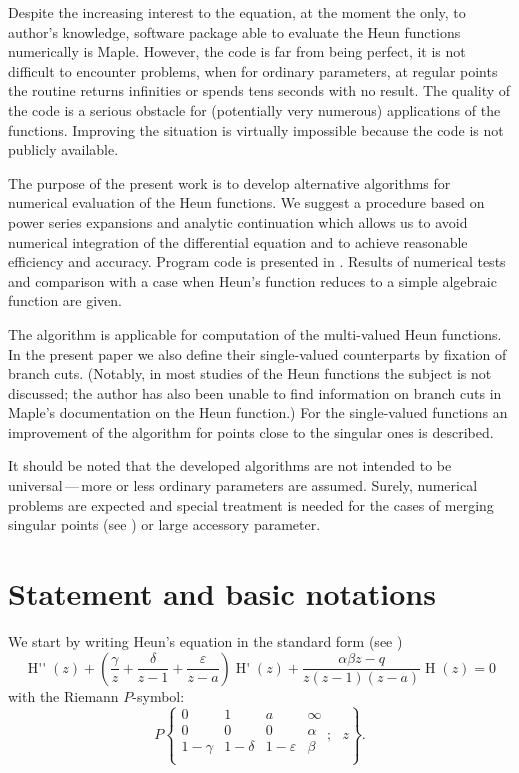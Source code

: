 \documentclass[11pt]{article}
\newcommand{\MF}[1]{\mathop{#1}\nolimits}
\def\Heun{H}%
\begin{document}
Despite the increasing interest to the equation, at the moment the only, to
author's knowledge, software package able to evaluate the Heun functions
numerically is Maple. However, the code is far from being perfect, it is not
difficult to encounter problems, when for ordinary parameters, at regular points
the routine returns infinities or spends tens seconds with no result. The quality
of the code is a serious obstacle for (potentially very numerous) applications
of the functions. Improving the situation is virtually impossible because the
code is not publicly available. 

The purpose of the present work is to develop alternative algorithms for
numerical evaluation of the Heun functions. We suggest a procedure based on
power series expansions and analytic continuation which allows us to avoid
numerical integration of the differential equation and to achieve reasonable
efficiency and accuracy. Program code is presented in \cite{mycode}. Results of
numerical tests and comparison with a case when Heun's function reduces to a
simple algebraic function are given.

The algorithm is applicable for computation of the multi-valued Heun functions.
In the present paper we also define their single-valued counterparts by fixation
of branch cuts. (Notably, in most studies of the Heun functions the subject is
not discussed; the author has also been unable to find information on branch
cuts in Maple's documentation on the Heun function.) For the single-valued
functions an improvement of the algorithm for points close to the singular ones
is described.

It should be noted that the developed algorithms are not intended to be
universal\,---\,more or less ordinary parameters are assumed. Surely, numerical
problems are expected and special treatment is needed for the cases of merging
singular points (see \cite{LaySlavyanov1999}) or large accessory parameter.

\section{Statement and basic notations} 
\label{sect:statement}

We start by writing Heun's equation in the standard form (see \cite{Erdelyi1955})
\begin{equation}
  \MF{\Heun''}(z)+\left(\frac{\gamma}{z}+\frac{\delta}{z-1}+
  \frac{\varepsilon}{z-a}\right)\MF{\Heun'}(z)+
  \frac{\alpha\beta z-q}{z(z-1)(z-a)}\MF{\Heun}(z)=0
\label{eq:Heun}
\end{equation}
with the Riemann $P$-symbol:
\[
P\left\{\begin{matrix}0 & 1 & a & \infty\\
0 & 0 & 0 & \alpha\\
1-\gamma & 1-\delta & 1-\varepsilon & \beta\\
\end{matrix};\ \ \ z\right\}.
\]
\end{document}
